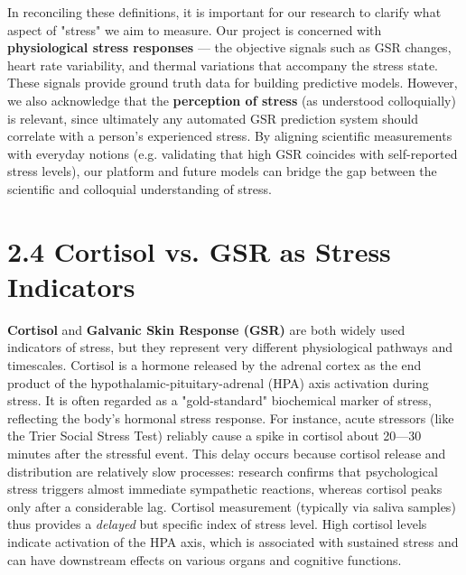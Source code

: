 In reconciling these definitions, it is important for our research to
clarify what aspect of "stress" we aim to measure. Our project is
concerned with \textbf{physiological stress responses} --- the objective
signals such as GSR changes, heart rate variability, and thermal
variations that accompany the stress state. These signals provide ground
truth data for building predictive models. However, we also acknowledge
that the \textbf{perception of stress} (as understood colloquially) is
relevant, since ultimately any automated GSR prediction system should
correlate with a person's experienced stress. By aligning scientific
measurements with everyday notions (e.g. validating that high GSR
coincides with self-reported stress levels), our platform and future
models can bridge the gap between the scientific and colloquial
understanding of stress.

\section{2.4 Cortisol vs. GSR as Stress Indicators}

\textbf{Cortisol} and \textbf{Galvanic Skin Response (GSR)} are both widely used
indicators of stress, but they represent very different physiological
pathways and timescales. Cortisol is a hormone released by the adrenal
cortex as the end product of the hypothalamic-pituitary-adrenal (HPA)
axis activation during stress. It is often regarded as a "gold-standard"
biochemical marker of stress, reflecting the body's hormonal stress
response. For instance, acute stressors (like the Trier Social Stress
Test) reliably cause a spike in cortisol about 20---30 minutes after the
stressful
event\cite{CortisolStressIndicator2020}.
This delay occurs because cortisol release and distribution are
relatively slow processes: research confirms that psychological stress
triggers almost immediate sympathetic reactions, whereas cortisol peaks
only after a considerable
lag\cite{CortisolStressIndicator2020}.
Cortisol measurement (typically via saliva samples) thus provides a
\textit{delayed} but specific index of stress level. High cortisol levels
indicate activation of the HPA axis, which is associated with sustained
stress and can have downstream effects on various organs and cognitive
functions.

